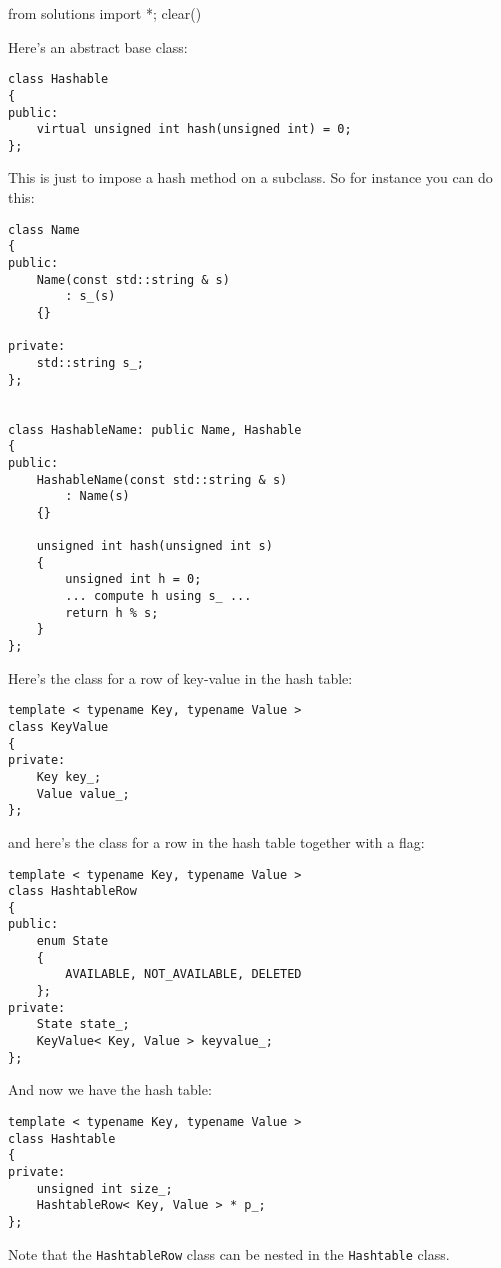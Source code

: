 \begin{python0}
from solutions import *; clear()
\end{python0}

Here's an abstract base class:
{\small
\begin{Verbatim}[frame=single]
class Hashable
{
public:
    virtual unsigned int hash(unsigned int) = 0;
};
\end{Verbatim}
}
This is just to impose a hash method on a subclass.
So for instance you can do this:
{\small
\begin{Verbatim}[frame=single]
class Name
{
public:
    Name(const std::string & s)
        : s_(s)
    {}

private:
    std::string s_;
};


class HashableName: public Name, Hashable
{
public:
    HashableName(const std::string & s)
        : Name(s) 
    {}
    
    unsigned int hash(unsigned int s)
    {
        unsigned int h = 0;
        ... compute h using s_ ...
        return h % s;
    }
};
\end{Verbatim}
}
Here's the class for a row of key-value in the hash table:
{\small
\begin{Verbatim}[frame=single]
template < typename Key, typename Value >
class KeyValue
{
private:
    Key key_;
    Value value_;
};
\end{Verbatim}
}
and here's the class for a row in the hash table together with a 
flag:
{\small
\begin{Verbatim}[frame=single]
template < typename Key, typename Value >
class HashtableRow
{
public:
    enum State
    { 
        AVAILABLE, NOT_AVAILABLE, DELETED 
    };
private:
    State state_;
    KeyValue< Key, Value > keyvalue_;
};
\end{Verbatim}
}
And now we have the hash table:
{\small
\begin{Verbatim}[frame=single]
template < typename Key, typename Value >
class Hashtable
{
private:
    unsigned int size_;
    HashtableRow< Key, Value > * p_;
};
\end{Verbatim}
}

Note that the \verb!HashtableRow! class can be nested in the \verb!Hashtable!
class.











\newpage
